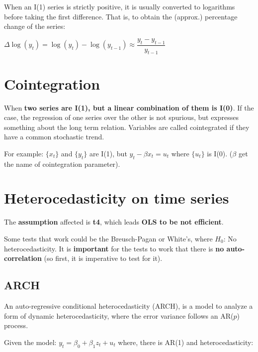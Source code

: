 \documentclass[10pt, a4paper, landscape]{extarticle}
\begin{document}
\begin{multicols}{3}
\begin{multicols}{2}
\end{multicols}

When an I(1) series is strictly positive, it is usually converted to logarithms before taking the first difference. That is, to obtain the (approx.) percentage change of the series:

\begin{center}
	$\Delta \log(y_t) = \log(y_t) - \log(y_{t - 1}) \approx \dfrac{y_t - y_{t - 1}}{y_{t - 1}}$
\end{center}

\columnbreak

\section*{Cointegration}

When \textbf{two series are I(1), but a linear combination of them is I(0)}. If the case, the regression of one series over the other is not spurious, but expresses something about the long term relation. Variables are called cointegrated if they have a common stochastic trend.

For example: $\lbrace x_t \rbrace$ and $\lbrace y_t \rbrace$ are I(1), but $y_t - \beta x_t = u_t$ where $\lbrace u_t \rbrace$ is I(0). ($\beta$ get the name of cointegration parameter).

\section*{Heterocedasticity on time series}

The \textbf{assumption} affected is \textbf{t4}, which leads \textbf{OLS to be not efficient}.

Some tests that work could be the Breusch-Pagan or White's, where $H_0$: No heterocedasticity. It is \textbf{important} for the tests to work that there is \textbf{no auto-correlation} (so first, it is imperative to test for it).

\subsection*{ARCH}

An auto-regressive conditional heterocedasticity (ARCH), is a model to analyze a form of dynamic heterocedasticity, where the error variance follows an AR($p$) process.

Given the model: $y_t = \beta_0 + \beta_1 z_t + u_t$ where, there is AR(1) and heterocedasticity:


\end{multicols}
\end{document}
